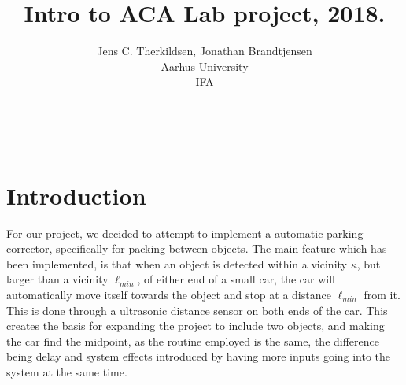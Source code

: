\documentclass[a4paper,onecolumn,amsmath,amssymb]{revtex4-1}
\begin{document}


\


\begin{titlepage}
\vspace{1cm}
\title{\Huge{Intro to ACA Lab project, 2018.}}
\author{Jens C. Therkildsen,  Jonathan Brandtjensen\\
Aarhus University\\
IFA}
\maketitle
\end{titlepage}
\newpage
{}
\mbox{}
\newpage
{}

\tableofcontents

\cleardoublepage



\noindent
\section{\textbf{Introduction}}

For our project, we decided to attempt to implement a automatic parking corrector, specifically for packing between objects. The main feature which has been implemented, is that when an object is detected within a vicinity $\kappa$, but larger than a vicinity $\ell_{min}$, of either end of a small car, the car will automatically move itself towards the object and stop at a distance $\ell_{min}$ from it. This is done through a ultrasonic distance sensor on both ends of the car. This creates the basis for expanding the project to include two objects, and making the car find the midpoint, as the routine employed is the same, the difference being delay and system effects introduced by having more inputs going into the system at the same time.\\
\end{document}
